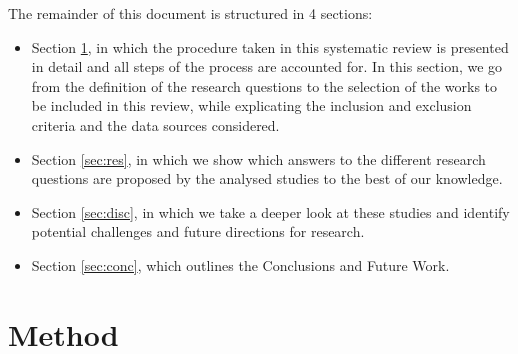 \documentclass[conference]{IEEEtran}
\begin{document}
The remainder of this document is structured in 4 sections:
\begin{itemize}
	\item Section \ref{sec:meth}, in which the procedure taken in this systematic review is presented in detail and all steps of the process are accounted for. In this section, we go from the definition of the research questions to the selection of the works to be included in this review, while explicating the inclusion and exclusion criteria and the data sources considered.
	\item Section \ref{sec:res}, in which we show which answers to the different research questions are proposed by the analysed studies to the best of our knowledge.
	\item Section \ref{sec:disc}, in which we take a deeper look at these studies and identify potential challenges and future directions for research.
	\item Section \ref{sec:conc}, which outlines the Conclusions and Future Work.
\end{itemize}

\section{Method}
\label{sec:meth}
\end{document}
